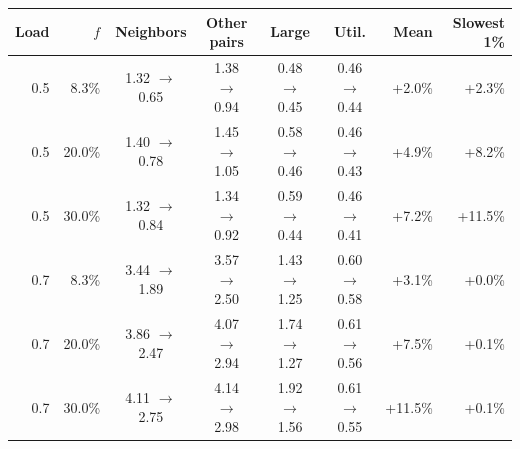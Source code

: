 \begin{tabular}{@{}rrccccrr@{}}
\toprule
Load & $f$ & Neighbors & Other pairs & Large & Util. & Mean & Slowest 1\% \\
\midrule
0.5 & 8.3\% & 1.32 $\to$ 0.65 & 1.38 $\to$ 0.94 & 0.48 $\to$ 0.45 & 0.46 $\to$ 0.44 & +2.0\% & +2.3\% \\
0.5 & 20.0\% & 1.40 $\to$ 0.78 & 1.45 $\to$ 1.05 & 0.58 $\to$ 0.46 & 0.46 $\to$ 0.43 & +4.9\% & +8.2\% \\
0.5 & 30.0\% & 1.32 $\to$ 0.84 & 1.34 $\to$ 0.92 & 0.59 $\to$ 0.44 & 0.46 $\to$ 0.41 & +7.2\% & +11.5\% \\
\midrule
0.7 & 8.3\% & 3.44 $\to$ 1.89 & 3.57 $\to$ 2.50 & 1.43 $\to$ 1.25 & 0.60 $\to$ 0.58 & +3.1\% & +0.0\% \\
0.7 & 20.0\% & 3.86 $\to$ 2.47 & 4.07 $\to$ 2.94 & 1.74 $\to$ 1.27 & 0.61 $\to$ 0.56 & +7.5\% & +0.1\% \\
0.7 & 30.0\% & 4.11 $\to$ 2.75 & 4.14 $\to$ 2.98 & 1.92 $\to$ 1.56 & 0.61 $\to$ 0.55 & +11.5\% & +0.1\% \\
\bottomrule
\end{tabular}

